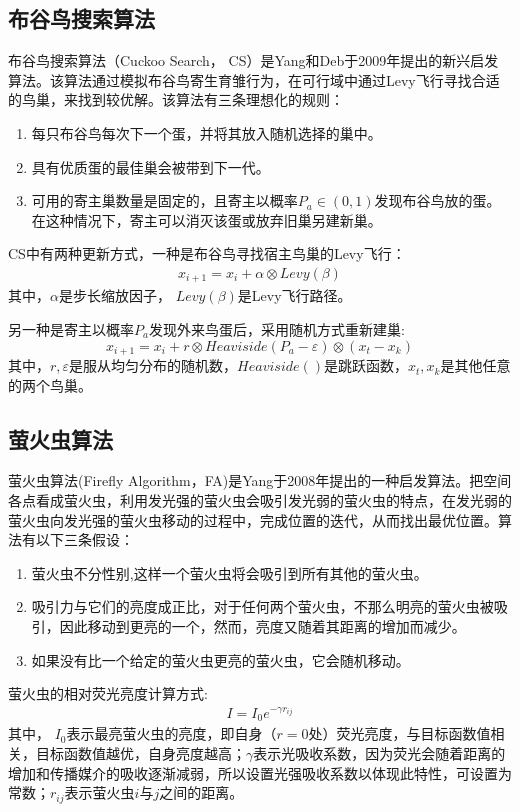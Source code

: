  \subsection{布谷鸟搜索算法}
    布谷鸟搜索算法（Cuckoo Search， CS）是Yang和Deb于2009年提出的新兴启发算法。该算法通过模拟布谷鸟寄生育雏行为，在可行域中通过Levy飞行寻找合适的鸟巢，来找到较优解。该算法有三条理想化的规则：
    \begin{enumerate}
      \item {每只布谷鸟每次下一个蛋，并将其放入随机选择的巢中。}
      \item {具有优质蛋的最佳巢会被带到下一代。}
      \item {可用的寄主巢数量是固定的，且寄主以概率$P_a\in(0,1)$发现布谷鸟放的蛋。在这种情况下，寄主可以消灭该蛋或放弃旧巢另建新巢。}
    \end{enumerate}

    CS中有两种更新方式，一种是布谷鸟寻找宿主鸟巢的Levy飞行：
    \begin{align}
      x_{i+1}=x_i+\alpha\otimes Levy(\beta)
    \end{align}
    其中，$\alpha$是步长缩放因子， $Levy(\beta)$是Levy飞行路径。

    另一种是寄主以概率$P_a$发现外来鸟蛋后，采用随机方式重新建巢:
    \begin{equation}
      x_{i+1}=x_i+r\otimes Heaviside(P_a-\varepsilon)\otimes(x_t-x_k)
    \end{equation}
    其中，$r,\varepsilon$是服从均匀分布的随机数，$Heaviside()$是跳跃函数，$x_t,x_k$是其他任意的两个鸟巢。

  \subsection{萤火虫算法}
    萤火虫算法(Firefly Algorithm，FA)是Yang于2008年提出的一种启发算法。把空间各点看成萤火虫，利用发光强的萤火虫会吸引发光弱的萤火虫的特点，在发光弱的萤火虫向发光强的萤火虫移动的过程中，完成位置的迭代，从而找出最优位置。算法有以下三条假设：
    \begin{enumerate}
      \item {萤火虫不分性别,这样一个萤火虫将会吸引到所有其他的萤火虫。}
      \item {吸引力与它们的亮度成正比，对于任何两个萤火虫，不那么明亮的萤火虫被吸引，因此移动到更亮的一个，然而，亮度又随着其距离的增加而减少。}
      \item {如果没有比一个给定的萤火虫更亮的萤火虫，它会随机移动。}
    \end{enumerate}
    萤火虫的相对荧光亮度计算方式:
    \begin{align}
      I=I_0e^{-\gamma r_{ij}}
    \end{align}
    其中， $I_0$表示最亮萤火虫的亮度，即自身（$r=0$处）荧光亮度，与目标函数值相关，目标函数值越优，自身亮度越高；$\gamma$表示光吸收系数，因为荧光会随着距离的增加和传播媒介的吸收逐渐减弱，所以设置光强吸收系数以体现此特性，可设置为常数；$r_{ij}$表示萤火虫$i$与$j$之间的距离。 

